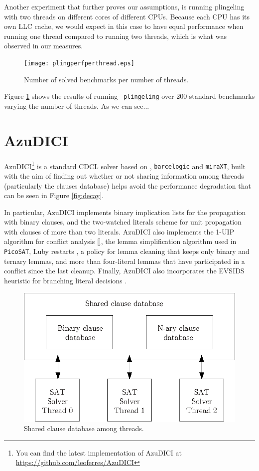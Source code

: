 \documentclass{llncs}
\begin{document}
Another experiment that further proves our assumptions, is running
plingeling with two threads on different cores of different
CPUs. Because each CPU has its own LLC cache, we would expect in this
case to have equal performance when running one thread compared to
running two threads, which is what was observed in our measures.

\begin{figure}[htp]
  \centering
  \texttt{[image: plingperfperthread.eps]}
  \caption{Number of solved benchmarks per number of threads.}
  \label{fig:pperfpthread}
\end{figure}

Figure \ref{fig:pperfpthread} shows the results of running {\tt
  plingeling} over 200 standard benchmarks varying the number of
threads. As we can see...

\section{AzuDICI}
\label{sec:azudici}

AzuDICI\footnote{You can find the latest implementation of AzuDICI at
  \url{https://github.com/leoferres/AzuDICI}} is a standard CDCL
solver based on \pling, {\tt barcelogic} and {\tt miraXT}, built with
the aim of finding out whether or not sharing information among
threads (particularly the clauses database) helps avoid the
performance degradation that can be seen in Figure \ref{fig:decay}.

In particular, AzuDICI implements binary implication lists for the
propagation with binary clauses, and the two-watched literals scheme
for unit propagation \cite{} with clauses of more than two
literals. AzuDICI also implements the 1-UIP algorithm for conflict
analysis \ref{}, the lemma simplification algorithm used in {\tt
  PicoSAT}, Luby restarts \cite{}, a policy for lemma cleaning that
keeps only binary and ternary lemmas, and more than four-literal
lemmas that have participated in a conflict since the last
cleanup. Finally, AzuDICI also incorporates the EVSIDS heuristic for
branching literal decisions \cite{}.

\begin{figure}[tp]
  \centering
  \includegraphics[scale=0.7]{AzuDICI_database}
  \caption{Shared clause database among threads.}
  \label{fig:azu database}
\end{figure}
\end{document}
